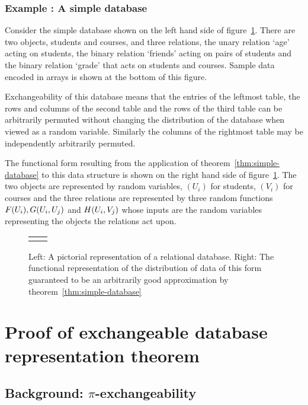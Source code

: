 \subsubsection{Example : A simple database}

Consider the simple database shown on the left hand side of figure~\ref{fig:multi-rel-seq}.
There are two objects, students and courses, and three relations, the unary relation `age' acting on students, the binary relation `friends' acting on pairs of students and the binary relation `grade' that acts on students and courses.
Sample data encoded in arrays is shown at the bottom of this figure.

Exchangeability of this database means that the entries of the leftmost table, the rows and columns of the second table and the rows of the third table can be arbitrarily permuted without changing the distribution of the database when viewed as a random variable.
Similarly the columns of the rightmost table may be independently arbitrarily permuted.

The functional form resulting from the application of theorem~\ref{thm:simple-database} to this data structure is shown on the right hand side of figure~\ref{fig:multi-rel-seq}.
The two objects are represented by \iid random variables, $(U_i)$ for students, $(V_i)$ for courses and the three relations are represented by three random functions $F(U_i),G(U_i,U_j)$ and $H(U_i,V_j)$ whose inputs are the random variables representing the objects the relations act upon.

\begin{figure}[ht]
\centering
\begin{tabular}{cc}
\tiny  & \tiny 
\end{tabular}
\caption{Left: A pictorial representation of a relational database. Right: The functional representation of the distribution of data of this form guaranteed to be an arbitrarily good approximation by theorem~\ref{thm:simple-database}}
\label{fig:multi-rel-seq}
\end{figure}

\section{Proof of exchangeable database representation theorem}
\label{sec:proof_database}

\subsection{Background: $\pi$-exchangeability}

